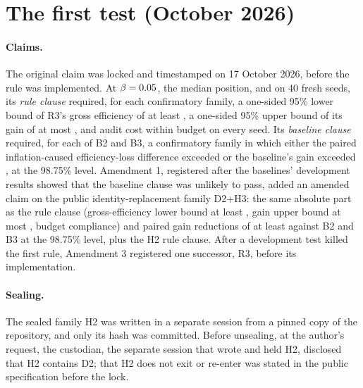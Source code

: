 \documentclass[11pt]{article}
\begin{document}
\clearpage

\FloatBarrier
\section{The first test (October 2026)}\label{sec:eval1}
\paragraph{Claims.} The original claim was locked and timestamped on 17 October 2026, before the rule was implemented. At $\beta = 0.05$, the median position, and on 40 fresh seeds, its \emph{rule clause} required, for each confirmatory family, a one-sided 95\% lower bound of R3's gross efficiency of at least , a one-sided 95\% upper bound of its gain of at most , and audit cost within budget on every seed. Its \emph{baseline clause} required, for each of B2 and B3, a confirmatory family in which either the paired inflation-caused efficiency-loss difference exceeded  or the baseline's gain exceeded , at the 98.75\% level. Amendment 1, registered after the baselines' development results showed that the baseline clause was unlikely to pass, added an amended claim on the public identity-replacement family D2+H3: the same absolute part as the rule clause (gross-efficiency lower bound at least , gain upper bound at most , budget compliance) and paired gain reductions of at least  against B2 and B3 at the 98.75\% level, plus the H2 rule clause. After a development test killed the first rule, Amendment 3 registered one successor, R3, before its implementation.

\paragraph{Sealing.} The sealed family H2 was written in a separate session from a pinned copy of the repository, and only its hash was committed. Before unsealing, at the author's request, the custodian, the separate session that wrote and held H2, disclosed that H2 contains D2; that H2 does not exit or re-enter was stated in the public specification before the lock.
\end{document}
